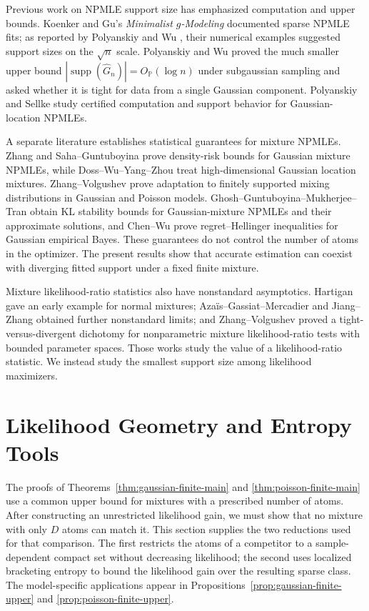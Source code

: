 \documentclass[11pt]{article}
\theoremstyle{definition}
\numberwithin{equation}{section}
\newcommand{\wh}{\widehat}
\DeclareMathOperator{\supp}{supp}
\begin{document}
Previous work on NPMLE support size has emphasized computation and upper
bounds. Koenker and Gu's \emph{Minimalist $g$-Modeling}
\cite{koenker2019minimalist} documented sparse NPMLE fits; as reported by
Polyanskiy and Wu \cite{polyanskiy2020self}, their numerical examples suggested
support sizes on the \(\sqrt n\) scale. Polyanskiy and Wu proved the much
smaller upper bound \(|\supp(\wh G_n)|=O_{\mathbb P}(\log n)\) under
subgaussian sampling and asked whether it is tight for data from a single
Gaussian component. Polyanskiy and Sellke \cite{polyanskiySellke2025} study
certified computation and support behavior for Gaussian-location NPMLEs.

A separate literature establishes statistical guarantees for mixture NPMLEs.
Zhang \cite{zhang2009generalized} and Saha--Guntuboyina
\cite{saha2020nonparametric} prove density-risk bounds for Gaussian mixture
NPMLEs, while Doss--Wu--Yang--Zhou \cite{doss2020optimal} treat
high-dimensional Gaussian location mixtures. Zhang--Volgushev
\cite{zhangVolgushev2026adaptivity} prove adaptation to finitely supported
mixing distributions in Gaussian and Poisson models.
Ghosh--Guntuboyina--Mukherjee--Tran
\cite{GhoshGuntuboyinaMukherjeeTran2026} obtain KL stability bounds for
Gaussian-mixture NPMLEs and their approximate solutions, and Chen--Wu
\cite{ChenWu2026RegretHellinger} prove regret--Hellinger inequalities for
Gaussian empirical Bayes. These guarantees do not control the number of atoms
in the optimizer. The present results show that accurate estimation can
coexist with diverging fitted support under a fixed finite mixture.

Mixture likelihood-ratio statistics also have nonstandard asymptotics.
Hartigan \cite{hartigan1985failure} gave an early example for normal mixtures;
Aza{\"i}s--Gassiat--Mercadier \cite{azais2009likelihood} and Jiang--Zhang
\cite{jiangZhang2019rate} obtained further nonstandard limits; and
Zhang--Volgushev \cite{zhangVolgushev2025surprising} proved a
tight-versus-divergent dichotomy for nonparametric mixture likelihood-ratio
tests with bounded parameter spaces. Those works study the value of a
likelihood-ratio statistic. We instead study the smallest support size among
likelihood maximizers.

\section{Likelihood Geometry and Entropy Tools}
\label{sec:tools}

The proofs of Theorems~\ref{thm:gaussian-finite-main} and
\ref{thm:poisson-finite-main} use a common upper bound for mixtures with a
prescribed number of atoms. After constructing an unrestricted likelihood
gain, we must show that
no mixture with only \(D\) atoms can match it. This section supplies the two
reductions used for that comparison. The first restricts the atoms of a
competitor to a sample-dependent compact set without decreasing likelihood;
the second uses
localized bracketing entropy to bound the likelihood gain over the resulting
sparse class. The model-specific applications appear in
Propositions~\ref{prop:gaussian-finite-upper} and
\ref{prop:poisson-finite-upper}.
\end{document}
